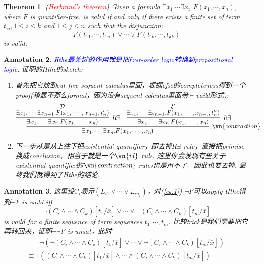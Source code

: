 \documentclass{article}
\theoremstyle{plain}
\newtheorem{theorem}{Theorem}
\newtheorem{annotation}[theorem]{Annotation}
\theoremstyle{nonumberplain}
\newcommand{\redt}[1]{\textcolor{red}{#1}}
\newcommand{\bluet}[1]{\textcolor{blue}{#1}}
\begin{document}
\begin{theorem}
\rm (\redt{Herbrand's theorem}) Given a formula $\exists x_1. \cdots \exists x_n. F(x_1,\cdots,x_n)$, where $F$ is quantifier-free, is valid if and only if there exists a finite set of term $t_{ij}, 1 \leq i \leq k$ and $1 \leq j \leq n$ such that the disjunction:
\[
F(t_{11},\cdots,t_{1n}) \vee \cdots \vee F(t_{1k},\cdots,t_{nk})
\]
is valid. 
\end{theorem}

\begin{annotation}
\rm \bluet{Hthe最关键的作用就是把first-order logic转换到propositional logic}. 证明的Hthe的sketch:
\begin{enumerate}
	\item 首先把它放到cut-free sequent calculus里面，根据cfsc的completeness得到一个proof(稍显不那么formal，因为没有sequent calculus里面带$\vdash$vaild形式):
	\[
	\infer[\vn{contraction}]{ \exists x_1. \cdots \exists x_n. F(x_1,		\cdots,x_n)}{\infer[R \exists]{\exists x_1. \cdots \exists x_n. F(x_1,	\cdots,x_n)}{\deduce{\exists x_1. \cdots \exists x_{n-1}. F(x_1,\cdots,x_{n-1},t_n')}{\mathcal{D}}} & \infer[R \exists]{\exists x_1. \cdots \exists x_n. F(x_1,\cdots,x_n)}{\deduce{\exists x_1. \cdots \exists x_{n-1}. F(x_1,\cdots,x_{n-1},t_n'')}{\mathcal{E}}}}
	\]
	\item 下一步就是从上往下把existential quantifier，即去掉$R \exists$ rule，直接把primise换成conclusion，相当于就是一个$\vn{id}$ rule. 这里你会发现有些关于existential quantifier的$\vn{contraction}$ rules也是用不了，因此也要去掉. 最终我们就得到了Hthe的结论. 
\end{enumerate} 
\end{annotation}


\begin{annotation}
\rm 这里设$C_i$表示$(L_{i1} \vee \cdots \vee L_{in_i})$，对(\ref{eq:1}) $\neg F$可以apply Hthe得到$\neg F$ is vaild iff 
\[
\neg(C_i \wedge \cdots \wedge C_k)[\overline{t}_1/\overline{x}] \vee \cdots \vee \neg(C_i \wedge \cdots \wedge C_k)[\overline{t}_m/\overline{x}]
\]
is vaild for a finite sequence of term sequences $\overline{t}_1,\cdots,\overline{t}_m$. 比较trick是我们需要把它再转回来，证明$\neg \neg F$ is unsat，此时
\begin{equation}
\begin{aligned}
&\neg\left(\neg(C_i \wedge \cdots \wedge C_k)[\overline{t}_1/\overline{x}] \vee \cdots \vee \neg(C_i \wedge \cdots \wedge C_k)[\overline{t}_m/\overline{x}]\right) \\
\equiv & \left((C_i \wedge \cdots \wedge C_k)[\overline{t}_1/\overline{x}] \wedge \cdots \wedge (C_i \wedge \cdots \wedge C_k)[\overline{t}_m/\overline{x}]\right)
\end{aligned}
\end{equation}
\end{annotation}
\end{document}
